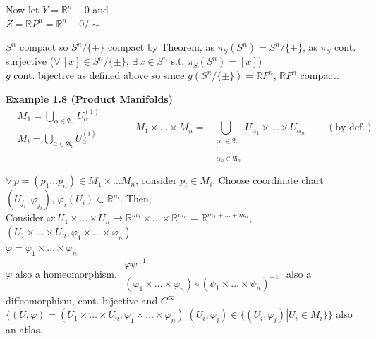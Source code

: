 Now let $Y = \mathbb{R}^n-0$ and \\
\phantom{Now let } $Z = \mathbb{R}P^n = \mathbb{R}^n-0 / \sim$


$S^n$ compact so $S^n/\lbrace \pm \rbrace$ compact by Theorem, as $\pi_S(S^n) = S^n/ \lbrace \pm \rbrace$, as $\pi_S$ cont. surjective ($\forall \, [x] \in S^n/\lbrace \pm \rbrace$, $\exists \, x \in S^n$ s.t. $\pi_S(S^n) = [x]$) \\
$g$ cont. bijective as defined above so since $g(S^n/\lbrace \pm \rbrace) = \mathbb{R}P^n$, $\mathbb{R}P^n$ compact.  


\textbf{Example 1.8 (Product Manifolds)}
\[
\begin{aligned}
  & M_1 = \bigcup_{\alpha \in \mathfrak{A}_1} U_{\alpha}^{(1)} \\ 
  & M_i = \bigcup_{\alpha \in \mathfrak{A}_i} U_{\alpha}^{(i)} 
\end{aligned} \quad \quad \quad \, 
M_1 \times \dots \times M_n = \bigcup_{ \begin{aligned} & \alpha_1 \in \mathfrak{A}_1 \\ 
& \vdots \\ 
    & \alpha_n \in \mathfrak{A}_n \end{aligned} }  U_{\alpha_1} \times \dots \times U_{\alpha_n} \quad \quad \, (\text{by def.})
\]

$\forall \, p = (p_1 \dots p_n) \in M_1 \times \dots M_n$, consider $p_i \in M_i$.  Choose coordinate chart $(U_{j_i}, \varphi_{j_i})$, $\varphi_i(U_i) \subset \mathbb{R}^{n_i}$.  Then,  \\

Consider $\varphi : U_1 \times \dots \times U_n \to \mathbb{R}^{m_1} \times \dots \times \mathbb{R}^{m_n} = \mathbb{R}^{ m_1 + \dots + m_n}$, $(U_1 \times \dots \times U_n, \varphi_1 \times \dots \times \varphi_n)$ \\
$\varphi = \varphi_1 \times \dots \times \varphi_n$\\
$\varphi$ also a homeomorphism.  $\begin{gathered} \varphi \psi^{-1} \\ (\varphi_1 \times \dots \times \varphi_n) \circ(\psi_1 \times \dots \times \psi_n)^{-1} \end{gathered}$ also a diffeomorphism, cont. bijective and $C^{\infty}$ \\
$\lbrace (U, \varphi)  = (U_1 \times \dots \times U_n, \varphi_1 \times \dots \times \varphi_n) | (U_i, \varphi_i) \in \lbrace (U_i, \varphi_i) | U_i \in M_i \rbrace \rbrace$ also an atlas.  



